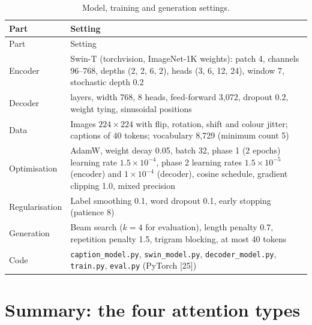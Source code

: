 \begin{longtable}[]{@{}
  >{\raggedright\arraybackslash}p{}
  >{\raggedright\arraybackslash}p{}@{}}
\caption{Model, training and generation settings.}\tabularnewline
\toprule\noalign{}
\begin{minipage}[b]{\linewidth}\raggedright
Part
\end{minipage} & \begin{minipage}[b]{\linewidth}\raggedright
Setting
\end{minipage} \\
\midrule\noalign{}
\endfirsthead
\toprule\noalign{}
\begin{minipage}[b]{\linewidth}\raggedright
Part
\end{minipage} & \begin{minipage}[b]{\linewidth}\raggedright
Setting
\end{minipage} \\
\midrule\noalign{}
\endhead
\bottomrule\noalign{}
\endlastfoot
Encoder & Swin-T (torchvision, ImageNet-1K weights): patch 4, channels 96--768, depths (2, 2, 6, 2), heads (3, 6, 12, 24), window 7, stochastic depth 0.2 \\
Decoder & 6 layers, width 768, 8 heads, feed-forward 3,072, dropout 0.2, weight tying, sinusoidal positions \\
Data & Images \(224 \times 224\) with flip, rotation, shift and colour jitter; captions of 40 tokens; vocabulary 8,729 (minimum count 5) \\
Optimisation & AdamW, weight decay 0.05, batch 32, phase 1 (2 epochs) learning rate \(1.5 \times 10^{-4}\), phase 2 learning rates \(1.5 \times 10^{-5}\) (encoder) and \(1 \times 10^{-4}\) (decoder), cosine schedule, gradient clipping 1.0, mixed precision \\
Regularisation & Label smoothing 0.1, word dropout 0.1, early stopping (patience 8) \\
Generation & Beam search (\(k = 4\) for evaluation), length penalty 0.7, repetition penalty 1.5, trigram blocking, at most 40 tokens \\
Code & \texttt{caption\_model.py}, \texttt{swin\_model.py}, \texttt{decoder\_model.py}, \texttt{train.py}, \texttt{eval.py} (PyTorch {[}25{]}) \\
\end{longtable}


\section{Summary: the four attention types}

